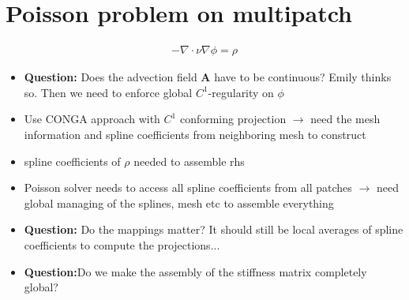 \documentclass[presentation.tex]{subfiles}
\begin{document}
\section{Poisson problem on multipatch}
\begin{align*}
    -\nabla \cdot \nu \nabla \phi = \rho
\end{align*}
\begin{itemize}
    \item \textbf{Question:} Does the advection field $\mathbf{A}$ have to be
            continuous? Emily thinks so. Then we need to enforce global $C^1$-regularity on $\phi$ 
    \item Use CONGA approach with $C^1$ conforming projection $\rightarrow$ 
            need the mesh information and spline coefficients from neighboring mesh
            to construct 
    \item spline coefficients of $\rho$ needed to assemble rhs
    \item Poisson solver needs to access all spline coefficients from all patches
            $\rightarrow$ need global managing of the splines, mesh etc 
            to assemble everything
    \item \textbf{Question:} Do the mappings matter? It should still be local 
            averages of spline coefficients to compute the projections...
    \item \textbf{Question:}Do we make the assembly of the stiffness matrix completely global?
\end{itemize}
\end{document}
